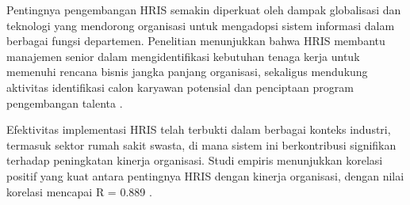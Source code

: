 Pentingnya pengembangan HRIS semakin diperkuat oleh dampak globalisasi dan teknologi yang mendorong organisasi untuk mengadopsi sistem informasi dalam berbagai fungsi departemen. Penelitian menunjukkan bahwa HRIS membantu manajemen senior dalam mengidentifikasi kebutuhan tenaga kerja untuk memenuhi rencana bisnis jangka panjang organisasi, sekaligus mendukung aktivitas identifikasi calon karyawan potensial dan penciptaan program pengembangan talenta \cite{ozel2012importance}.

Efektivitas implementasi HRIS telah terbukti dalam berbagai konteks industri, termasuk sektor rumah sakit swasta, di mana sistem ini berkontribusi signifikan terhadap peningkatan kinerja organisasi. Studi empiris menunjukkan korelasi positif yang kuat antara pentingnya HRIS dengan kinerja organisasi, dengan nilai korelasi mencapai R = 0.889 \cite{khashman2016impact}.




        
        


